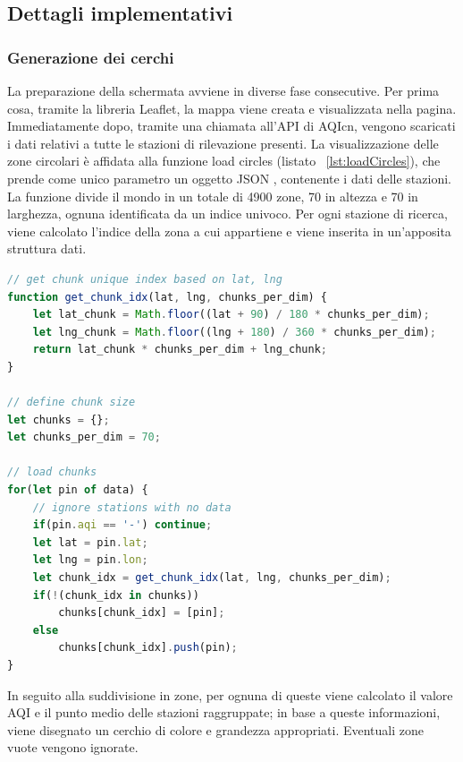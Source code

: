 \subsection{Dettagli implementativi}
\subsubsection{Generazione dei cerchi}
La preparazione della schermata avviene in diverse fase consecutive.
Per prima cosa, tramite la libreria Leaflet, la mappa viene creata e visualizzata nella pagina.
Immediatamente dopo, tramite una chiamata all'API di AQIcn, vengono scaricati i dati relativi a tutte le stazioni di rilevazione presenti.
La visualizzazione delle zone circolari è affidata alla funzione load circles (listato ~\ref{lst:loadCircles}), che prende come unico parametro un oggetto JSON \cite{json}, contenente i dati delle stazioni.
La funzione divide il mondo in un totale di 4900 zone, 70 in altezza e 70 in larghezza, ognuna identificata da un indice univoco.
Per ogni stazione di ricerca, viene calcolato l'indice della zona a cui appartiene e viene inserita in un'apposita struttura dati.
\begin{lstlisting}[language=Javascript,caption={Suddivisione in zone delle stazioni.},label={lst:loadCircles}]
// get chunk unique index based on lat, lng
function get_chunk_idx(lat, lng, chunks_per_dim) {
    let lat_chunk = Math.floor((lat + 90) / 180 * chunks_per_dim);
    let lng_chunk = Math.floor((lng + 180) / 360 * chunks_per_dim);
    return lat_chunk * chunks_per_dim + lng_chunk;
}

// define chunk size
let chunks = {};
let chunks_per_dim = 70;   

// load chunks
for(let pin of data) {
    // ignore stations with no data
    if(pin.aqi == '-') continue;
    let lat = pin.lat;
    let lng = pin.lon;
    let chunk_idx = get_chunk_idx(lat, lng, chunks_per_dim);
    if(!(chunk_idx in chunks)) 
        chunks[chunk_idx] = [pin];
    else 
        chunks[chunk_idx].push(pin);
}
\end{lstlisting}
In seguito alla suddivisione in zone, per ognuna di queste viene calcolato il valore AQI e il punto medio delle stazioni raggruppate; 
in base a queste informazioni, viene disegnato un cerchio di colore e grandezza appropriati. Eventuali zone vuote vengono ignorate.


